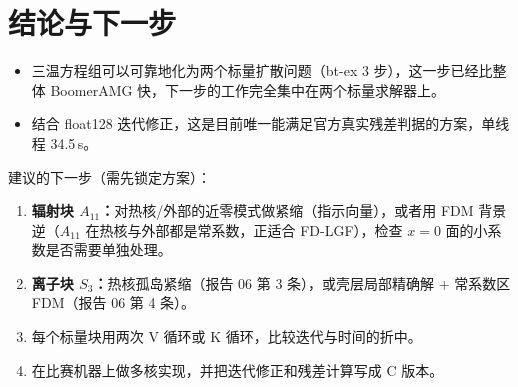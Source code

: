 \documentclass[11pt,a4paper]{ctexart}
\begin{document}
\section{结论与下一步}
\begin{itemize}
\item 三温方程组可以可靠地化为两个标量扩散问题（bt-ex 3 步），这一步已经比整体 BoomerAMG 快，下一步的工作完全集中在两个标量求解器上。
\item 结合 float128 迭代修正，这是目前唯一能满足官方真实残差判据的方案，单线程 34.5\,s。
\end{itemize}
建议的下一步（需先锁定方案）：
\begin{enumerate}
\item \textbf{辐射块 $A_{11}$：}对热核/外部的近零模式做紧缩（指示向量），或者用 FDM 背景逆（$A_{11}$ 在热核与外部都是常系数，正适合 FD-LGF），检查 $x=0$ 面的小系数是否需要单独处理。
\item \textbf{离子块 $S_3$：}热核孤岛紧缩（报告 06 第 3 条），或壳层局部精确解 + 常系数区 FDM（报告 06 第 4 条）。
\item 每个标量块用两次 V 循环或 K 循环，比较迭代与时间的折中。
\item 在比赛机器上做多核实现，并把迭代修正和残差计算写成 C 版本。
\end{enumerate}
\end{document}
